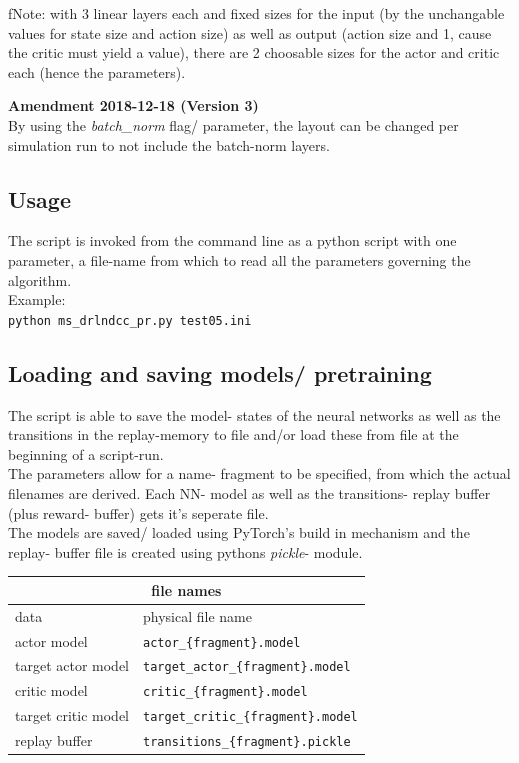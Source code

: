 \documentclass[a4paper]{article}
\begin{document}
f{Note:} with 3 linear layers each and fixed sizes for the input
(by the unchangable values for state size and action size) as well as output
(action size and 1, cause the critic must yield a value), there are 2
choosable sizes for the actor and critic each (hence the parameters).

\textbf{Amendment 2018-12-18 (Version 3)}\\
By using the \textit{batch\_norm} flag/ parameter, the layout can be changed
per simulation run to not include the batch-norm layers.

\subsection{Usage}
The script is invoked from the command line as a python script with one parameter,
a file-name from which to read all the parameters governing the algorithm.
\\
Example:\\
\texttt{python ms\_drlndcc\_pr.py test05.ini}

\subsection{Loading and saving models/ pretraining}
The script is able to save the model- states of the neural networks as well as
the transitions in the replay-memory to file and/or load these from file
at the beginning of a script-run.
\\
The parameters allow for a name- fragment to be specified, from which the
actual filenames are derived. Each NN- model as well as the transitions-
replay buffer (plus reward- buffer) gets it's seperate file.
\\
The models are saved/ loaded using PyTorch's build in mechanism and the
replay- buffer file is created using pythons \textit{pickle}- module.

\small
\begin{tabular}{ |l|l| }
  \hline
  \multicolumn{2}{|c|}{file names} \\
  \hline
data & physical file name \\
  \hline
actor model & \texttt{actor\_\{fragment\}.model} \\
target actor model & \texttt{target\_actor\_\{fragment\}.model} \\
critic model & \texttt{critic\_\{fragment\}.model} \\
target critic model & \texttt{target\_critic\_\{fragment\}.model} \\
replay buffer & \texttt{transitions\_\{fragment\}.pickle} \\
  \hline
\end{tabular}
\normalsize
\end{document}
